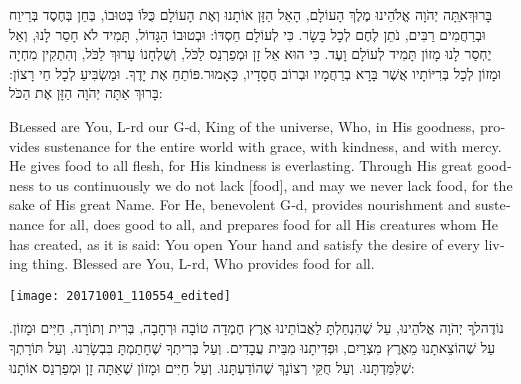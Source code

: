 \documentclass{minimal}
\begin{document}
\begin{samepage}
\lettrine[lines=2, depth=1, findent=1.5em]{בָּרוּךְ} אַתָּה יְהֹוָה אֱלֹהֵינוּ מֶלֶךְ הָעוֹלָם, הָאֵל הַזָּן אוֹתָנוּ וְאֶת הָעוֹלָם כֻּלּוֹ בְּטוּבוֹ, בְּחֵן בְּחֶסֶד בְּרֵיוַח וּבְרַחֲמִים רַבִּים, נֹתֵן לֶחֶם לְכָל בָּשָׂר. כִּי לְעוֹלָם חַסְדּוֹ: וּבְטוּבוֹ הַגָּדוֹל, תָּמִיד לֹא חָסַר לָנוּ, וְאַל יֶחְסַר לָנוּ מָזוֹן תָּמִיד לְעוֹלָם וָעֶד. כִּי הוּא אֵל זָן וּמְפַרְנֵס לַכֹּל, וְשֻׁלְחָנוֹ עָרוּךְ לַכֹּל, וְהִתְקִין מִחְיָה וּמָזוֹן לְכָל בְּרִיּוֹתָיו אֲשֶׁר בָּרָא בְרַחֲמָיו וּבְרוֹב חֲסָדָיו, כָּאָמוּר.פּוֹתֵחַ אֶת יָדֶךָ. וּמַשְׂבִּיעַ לְכָל חַי רָצוֹן: בָּרוּךְ אַתָּה יְהֹוָה הַזָּן אֶת הַכֹּל:

\begin{english}

\lettrine[]{B}lessed are You, L-rd our G‑d, King of the universe, Who, in His goodness, provides sustenance for the entire world with grace, with kindness, and with mercy. He gives food to all flesh, for His kindness is everlasting. Through His great goodness to us continuously we do not lack [food], and may we never lack food, for the sake of His great Name. For He, benevolent G‑d, provides nourishment and sustenance for all, does good to all, and prepares food for all His creatures whom He has created, as it is said: You open Your hand and satisfy the desire of every living thing. Blessed are You, L-rd, Who provides food for all.

\end{english}
\end{samepage}

\begin{center}
\texttt{[image: 20171001\_110554\_edited]}
\end{center}

\lettrine[lines=2, depth=1, findent=1.5em]{נוֹדֶה}לְךָ יְהֹוָה אֱלֹהֵינוּ, עַל שֶׁהִנְחַלְתָּ לַאֲבוֹתֵינוּ אֶרֶץ חֶמְדָה טוֹבָה וּרְחָבָה, בְּרִית וְתוֹרָה, חַיִּים וּמָזוֹן. עַל שֶׁהוֹצֵאתָנוּ מֵאֶרֶץ מִצְרַיִם, וּפְדִיתָנוּ מִבֵּית עֲבָדִים. וְעַל בְּרִיתְךָ שֶׁחָתַמְתָּ בִּבְשָׂרֵנוּ. וְעַל תּוֹרָתְךָ שֶׁלִּמַּדְתָּנוּ. וְעַל חֻקֵּי רְצוֹנָךְ שֶׁהוֹדַעְתָּנוּ. וְעַל חַיִּים וּמָזוֹן שֶׁאַתָּה זָן וּמְפַרְנֵס אוֹתָנוּ:
\end{document}
